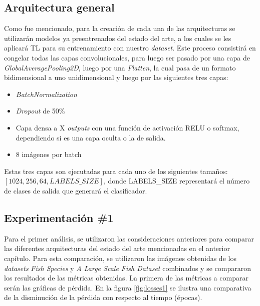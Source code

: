 \subsection{Arquitectura general}
Como fue mencionado, para la creación de cada una de las arquitecturas se utilizarán modelos ya preentrenados del estado del arte, a los cuales se les aplicará TL para su entrenamiento con nuestro \textit{dataset}. Este proceso consistirá en congelar todas las capas convolucionales, para luego ser pasado por una capa de \textit{GlobalAveragePooling2D}, luego por una \textit{Flatten}, la cual pasa de un formato bidimensional a uno unidimensional y luego por las siguientes tres capas: 
\begin{itemize}
    \item \textit{BatchNormalization}
    \item \textit{Dropout} de 50\%
    \item Capa densa a X \textit{outputs} con una función de activación RELU o softmax, dependiendo si es una capa oculta o la de salida.  
    \item 8 imágenes por batch 
\end{itemize}

Estas tres capas son ejecutadas para cada uno de los siguientes tamaños: $[1024,256,64,LABELS\_SIZE]$, donde LABELS\_SIZE representará el número de clases de salida que generará el clasificador.  

\subsection{Experimentación \#1}

Para el primer análisis, se utilizaron las consideraciones anteriores para comparar las diferentes arquitecturas del estado del arte mencionadas en el anterior capítulo. Para esta comparación, se utilizaron las imágenes obtenidas de los \textit{datasets} \textit{Fish Species} y \textit{A Large Scale Fish Dataset} combinados y se compararon los resultados de las métricas obtenidas. 
La primera de las métricas a comparar serán las gráficas de pérdida. En la figura \ref{fig:losses1} se ilustra una comparativa de la disminución de la pérdida con respecto al tiempo (épocas).

